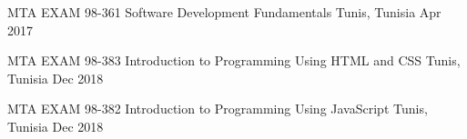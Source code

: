 



\begin{cvcertificates}

  \cvcertificate
    {MTA EXAM 98-361} %
    {Software Development Fundamentals} %
    {Tunis, Tunisia} %
    {Apr 2017} %

  \cvcertificate
    {MTA EXAM 98-383} %
    {Introduction to Programming Using HTML and CSS} %
    {Tunis, Tunisia} %
    {Dec 2018} %
    
  \cvcertificate
    {MTA EXAM 98-382} %
    {Introduction to Programming Using JavaScript} %
    {Tunis, Tunisia} %
    {Dec 2018} %
\end{cvcertificates}
